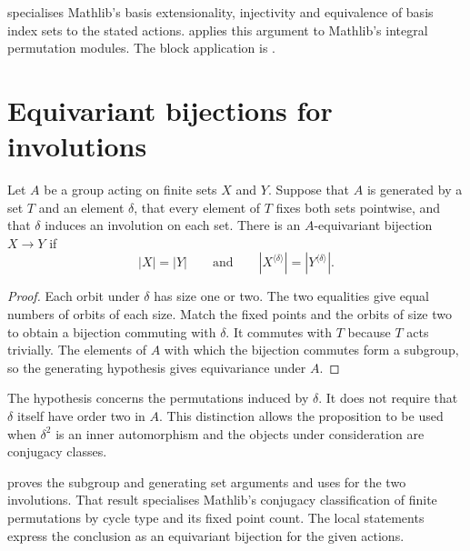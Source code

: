 \begin{implementation}
 specialises Mathlib's basis
extensionality, injectivity and equivalence of basis index sets to the
stated actions.  applies
this argument to Mathlib's integral permutation modules. The block application is
.
\end{implementation}

\section{Equivariant bijections for involutions}

\begin{proposition}
Let $A$ be a group acting on finite sets $X$ and $Y$. Suppose that $A$ is generated by a
set $T$ and an element $\delta$, that every element of $T$ fixes both sets
pointwise, and that $\delta$ induces an involution on each set. There is
an $A$-equivariant bijection $X\longrightarrow Y$ if
\[
 |X|=|Y|\qquad\text{and}\qquad |X^{\langle\delta\rangle}|
   =|Y^{\langle\delta\rangle}|.
\]
\end{proposition}

\begin{proof}
Each orbit under $\delta$ has size one or two. The two equalities give
equal numbers of orbits of each size. Match the fixed points and the
orbits of size two to obtain a bijection commuting with $\delta$.
It commutes with $T$ because $T$ acts trivially. The elements of $A$
with which the bijection commutes form a subgroup, so the generating
hypothesis gives equivariance under $A$.
\end{proof}

The hypothesis concerns the permutations induced by $\delta$. It does
not require that $\delta$ itself have order two in $A$. This distinction
allows the proposition to be used when $\delta^2$ is an inner automorphism
and the objects under consideration are conjugacy classes.

\begin{implementation}
 proves the subgroup
and generating set arguments and uses
 for the two involutions. That result
specialises Mathlib's conjugacy classification of finite permutations by cycle type
and its fixed point count. The local statements express the conclusion as
an equivariant bijection for the given actions.
\end{implementation}

